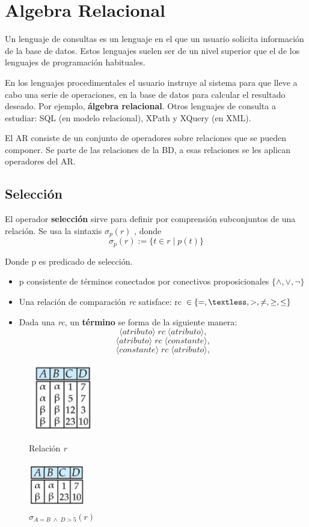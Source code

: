 \documentclass[12pt,a4paper]{report}
\newcounter{neq}
\begin{document}
			
\chapter{Algebra Relacional}
		\par Un lenguaje de consultas es un lenguaje en el que un usuario solicita información de la base de datos. Estos lenguajes suelen ser de un nivel superior que el de los lenguajes de programación habituales.
		\par En los lenguajes procedimentales el usuario instruye al sistema para que lleve a cabo una serie de operaciones, en la base de datos para calcular el resultado deseado. Por ejemplo, \textbf{álgebra relacional}. Otros lenguajes de consulta a estudiar: SQL (en modelo relacional), XPath y XQuery (en XML).
		\par El AR consiste de un conjunto de operadores sobre relaciones que se pueden componer. Se parte de las relaciones de la BD, a esas relaciones se les aplican operadores del AR.
	
	\section{Selección}
		\par El operador \textbf{selección} sirve para definir por comprensión subconjuntos de una relación. Se usa la sintaxis $\sigma_{p}(r)$ , donde
		\[\sigma_{p}(r) := \lbrace t \in r \; | \; p(t) \rbrace \]
		\par Donde p es predicado de selección.
			\begin{itemize}
				\item p consistente de términos conectados por conectivos proposicionales $\{ \land, \lor, \neg \}$
				\item Una relación de comparación \textit{rc} satisface: rc $\in \{=, \textless, >, \neq, \geq, \leq \}$ 
				\item Dada una \textit{rc}, un \textbf{término} se forma de la siguiente manera:
				\[ \langle atributo \rangle \; rc \; \langle atributo \rangle,\]
				\[ \langle atributo \rangle \; rc \; \langle constante \rangle,\]
				\[ \langle constante \rangle \; rc \; \langle atributo \rangle,\]
			\end{itemize}

			\begin{figure}[htb]
				\centering
				\includegraphics[width=3cm, height=3cm]{./imagenes/seleccion1.png}
				\caption{Relación \textit{r}}
				\vspace{5mm}
				\includegraphics[width=2.5cm, height=2cm]{./imagenes/seleccion2.png}
				\caption{$\sigma_{A=B \; \land \; D > 5}(r)$}
			\end{figure}
\end{document}
